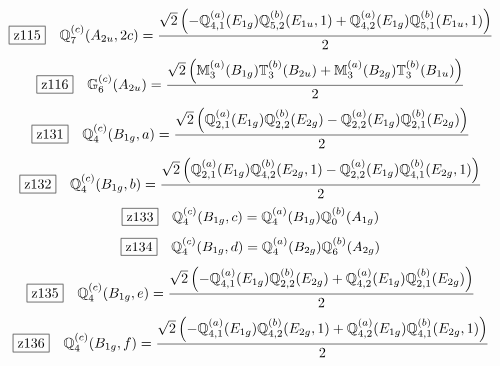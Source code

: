 \documentclass[fleqn,10pt,landscape]{jsarticle}
\begin{document}
\begin{dmath*}
\hspace*{3mm}\fbox{z115}\quad \mathbb{Q}_{7}^{(c)}(A_{2u},2c)=\frac{\sqrt{2} \left(- \mathbb{Q}_{4,1}^{(a)}(E_{1g}) \mathbb{Q}_{5,2}^{(b)}(E_{1u},1) + \mathbb{Q}_{4,2}^{(a)}(E_{1g}) \mathbb{Q}_{5,1}^{(b)}(E_{1u},1)\right)}{2}
\end{dmath*}
\begin{dmath*}
\hspace*{3mm}\fbox{z116}\quad \mathbb{G}_{6}^{(c)}(A_{2u})=\frac{\sqrt{2} \left(\mathbb{M}_{3}^{(a)}(B_{1g}) \mathbb{T}_{3}^{(b)}(B_{2u}) + \mathbb{M}_{3}^{(a)}(B_{2g}) \mathbb{T}_{3}^{(b)}(B_{1u})\right)}{2}
\end{dmath*}
\begin{dmath*}
\hspace*{3mm}\fbox{z131}\quad \mathbb{Q}_{4}^{(c)}(B_{1g},a)=\frac{\sqrt{2} \left(\mathbb{Q}_{2,1}^{(a)}(E_{1g}) \mathbb{Q}_{2,2}^{(b)}(E_{2g}) - \mathbb{Q}_{2,2}^{(a)}(E_{1g}) \mathbb{Q}_{2,1}^{(b)}(E_{2g})\right)}{2}
\end{dmath*}
\begin{dmath*}
\hspace*{3mm}\fbox{z132}\quad \mathbb{Q}_{4}^{(c)}(B_{1g},b)=\frac{\sqrt{2} \left(\mathbb{Q}_{2,1}^{(a)}(E_{1g}) \mathbb{Q}_{4,2}^{(b)}(E_{2g},1) - \mathbb{Q}_{2,2}^{(a)}(E_{1g}) \mathbb{Q}_{4,1}^{(b)}(E_{2g},1)\right)}{2}
\end{dmath*}
\begin{dmath*}
\hspace*{3mm}\fbox{z133}\quad \mathbb{Q}_{4}^{(c)}(B_{1g},c)=\mathbb{Q}_{4}^{(a)}(B_{1g}) \mathbb{Q}_{0}^{(b)}(A_{1g})
\end{dmath*}
\begin{dmath*}
\hspace*{3mm}\fbox{z134}\quad \mathbb{Q}_{4}^{(c)}(B_{1g},d)=\mathbb{Q}_{4}^{(a)}(B_{2g}) \mathbb{Q}_{6}^{(b)}(A_{2g})
\end{dmath*}
\begin{dmath*}
\hspace*{3mm}\fbox{z135}\quad \mathbb{Q}_{4}^{(c)}(B_{1g},e)=\frac{\sqrt{2} \left(- \mathbb{Q}_{4,1}^{(a)}(E_{1g}) \mathbb{Q}_{2,2}^{(b)}(E_{2g}) + \mathbb{Q}_{4,2}^{(a)}(E_{1g}) \mathbb{Q}_{2,1}^{(b)}(E_{2g})\right)}{2}
\end{dmath*}
\begin{dmath*}
\hspace*{3mm}\fbox{z136}\quad \mathbb{Q}_{4}^{(c)}(B_{1g},f)=\frac{\sqrt{2} \left(- \mathbb{Q}_{4,1}^{(a)}(E_{1g}) \mathbb{Q}_{4,2}^{(b)}(E_{2g},1) + \mathbb{Q}_{4,2}^{(a)}(E_{1g}) \mathbb{Q}_{4,1}^{(b)}(E_{2g},1)\right)}{2}
\end{dmath*}
\end{document}
